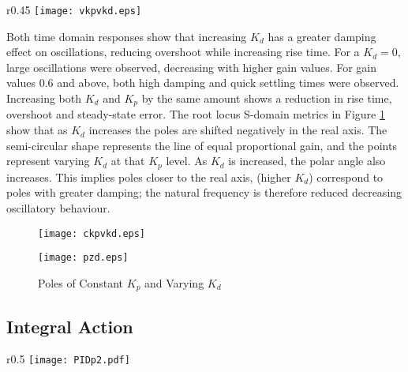\begin{wrapfigure}{r}{0.45\textwidth}
\centering
\vspace{-15pt} %
\texttt{[image: vkpvkd.eps]}
\vspace{-10pt}
\caption{Time-Domain Response For Varying $K_p$ and Varying $K_d$}
\label{vkpvkd}
\vspace{-15pt}
\end{wrapfigure}

Both time domain responses show that increasing \(K_d\) has a greater
damping effect on oscillations, reducing overshoot while increasing rise
time. For a \(K_d = 0\), large oscillations were observed, decreasing
with higher gain values. For gain values 0.6 and above, both high
damping and quick settling times were observed. Increasing both \(K_d\)
and \(K_p\) by the same amount shows a reduction in rise time, overshoot
and steady-state error. The root locus S-domain metrics in Figure
\ref{pzd} show that as \(K_d\) increases the poles are shifted
negatively in the real axis. The semi-circular shape represents the line
of equal proportional gain, and the points represent varying \(K_d\) at
that \(K_p\) level. As \(K_d\) is increased, the polar angle also
increases. This implies poles closer to the real axis, (higher \(K_d\))
correspond to poles with greater damping; the natural frequency is
therefore reduced decreasing oscillatory behaviour.

\begin{figure}[H]
\centering
\begin{minipage}{.455\textwidth}
 \centering
 \texttt{[image: ckpvkd.eps]}
 \caption{Time-Domain Response For Constant $K_p$ and Varying $K_d$}
 \label{ckpvkd}
\end{minipage}
\hfill
\begin{minipage}{.455\textwidth}
\centering
\texttt{[image: pzd.eps]}
\caption{Poles of Constant $K_p$ and Varying $K_d$}
\label{pzd}
\end{minipage}
\vspace{-20pt}
\end{figure}

\subsection{Integral Action}\label{integral-action}

\begin{wrapfigure}{r}{0.5\textwidth}
\centering
\vspace{-15pt} %
\texttt{[image: PIDp2.pdf]}
\vspace{-10pt}
\caption{PID Feedback Controller}
\label{PIDp2}
\vspace{-15pt}
\end{wrapfigure}

